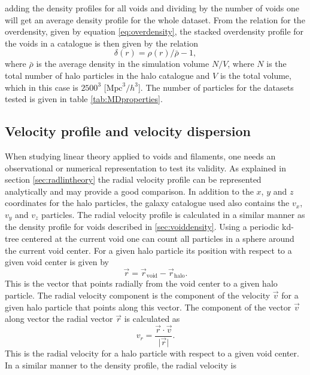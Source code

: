 adding the density profiles for all voids and dividing by the number of voids one
will get an average density profile for the whole dataset. From the relation for the overdensity, given by equation \ref{eq:overdensity},
the stacked overdensity profile for the voids in a catalogue is then given by the relation
\begin{equation}
    \delta(r)=\rho(r)/\bar{\rho}-1,
\end{equation}
where $\bar{\rho}$ is the average density in the simulation volume $N/V$, where $N$ is the total number of halo particles in the halo catalogue
and $V$ is the total volume, which in this case is $2500^3$ [$\mathrm{Mpc}^3/h^3$]. The number of particles for the datasets tested is given in table \ref{tab:MDproperties}. 
\subsection{Velocity profile and velocity dispersion}\label{sec:voidvel}
When studying linear theory applied to voids and filaments, one needs an observational or
numerical representation to test its validity. As explained in section
\ref{sec:radlintheory} the radial velocity profile can be represented analytically and
may provide a good comparison. In addition to the $x$, $y$ and $z$ coordinates for the
halo particles, the galaxy catalogue used also contains the $v_x$, $v_y$ and
$v_z$ particles. The radial velocity profile is calculated in a
similar manner as the density profile for voids described in
\ref{sec:voiddensity}. Using a periodic kd-tree centered at the current void one
can count all particles in a sphere around the current void center. For a given
halo particle its position with respect to a given void center is given by
\begin{equation}\label{eq:voidpos}
    \vec{r}=\vec{r}_{\mathrm{void}}-\vec{r}_{\mathrm{halo}}.
\end{equation}
This is the vector that points radially from the void center to a given halo
particle. The radial velocity component is the component of the velocity $\vec{v}$ for a
given halo particle that points along this vector. The component of the vector
$\vec{v}$ along vector the radial vector $\vec{r}$ is calculated as
\begin{equation}
    v_r=\frac{\vec{r}\cdot\vec{v}}{\vert\vec{r}\vert}.
\end{equation}
This is the radial velocity for a halo particle with respect to a given void
center. In a similar manner to the density profile, the radial velocity is

